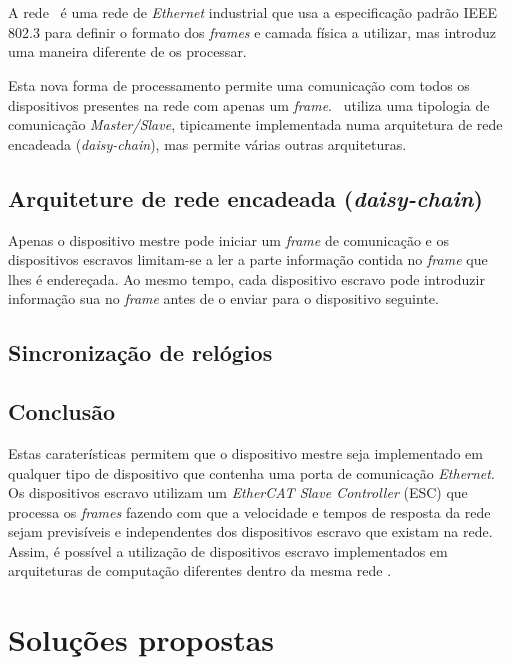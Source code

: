 \section{\ecat}\label{sec:ethercat}

A rede \ecat\ é uma rede de \emph{Ethernet} industrial que usa a
especificação padrão IEEE 802.3 \cite[]{ieee:IEEEStandardEthernet} para
definir o formato dos \emph{frames} e camada física a utilizar, mas
introduz uma maneira diferente de os processar.

Esta nova forma de processamento permite uma comunicação com todos os
dispositivos presentes na rede com apenas um \emph{frame}. \ecat\ utiliza
uma tipologia de comunicação \emph{Master/Slave}, tipicamente implementada
numa arquitetura de rede encadeada (\emph{daisy-chain}), mas permite várias
outras arquiteturas.

\subsection{Arquiteture de rede encadeada (\emph{daisy-chain})}
\label{sec:daisychain}
Apenas o dispositivo mestre pode iniciar um \emph{frame} de comunicação
e os dispositivos escravos limitam-se a ler a parte informação contida
no \emph{frame} que lhes é endereçada. Ao mesmo tempo, cada dispositivo
escravo pode introduzir informação sua  no \emph{frame} antes de o enviar
para o dispositivo seguinte.

\subsection{Sincronização de relógios}

\subsection{Conclusão}
Estas caraterísticas permitem que o dispositivo mestre seja implementado
em qualquer tipo de dispositivo que contenha uma porta de comunicação 
\emph{Ethernet}. Os dispositivos escravo utilizam um \emph{EtherCAT Slave
Controller} (ESC) que processa os \emph{frames} fazendo com que a velocidade
e tempos de resposta da rede sejam previsíveis e independentes dos 
dispositivos escravo que existam na rede. Assim, é possível a utilização
de dispositivos escravo implementados em arquiteturas de computação
diferentes dentro da mesma rede \ecat.


\section{Soluções propostas} \label{sec:solution}

